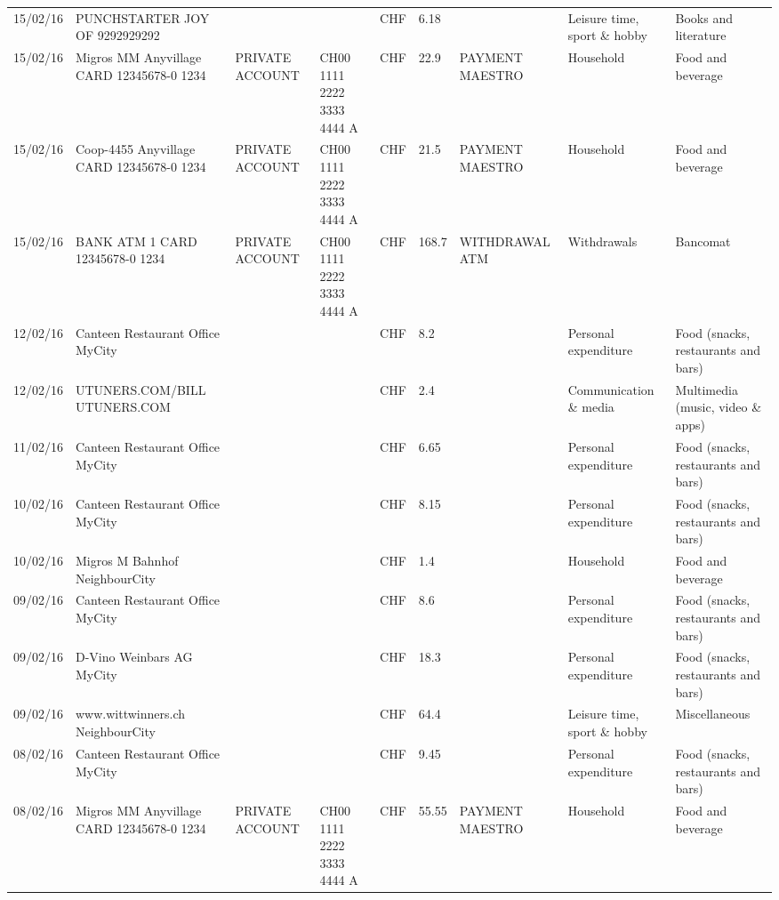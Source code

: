 \begin{landscape}
\begin{center}
\begin{longtable}{lllllllll}
		15/02/16 & PUNCHSTARTER JOY OF   9292929292 &       &       & CHF   & 6.18  &       & Leisure time, sport \& hobby & Books and literature \\
		15/02/16 & Migros MM Anyvillage CARD 12345678-0 1234 & PRIVATE ACCOUNT & CH00 1111 2222 3333 4444 A & CHF   & 22.9  & PAYMENT MAESTRO & Household & Food and beverage \\
		15/02/16 & Coop-4455 Anyvillage CARD 12345678-0 1234 & PRIVATE ACCOUNT & CH00 1111 2222 3333 4444 A & CHF   & 21.5  & PAYMENT MAESTRO & Household & Food and beverage \\
		15/02/16 & BANK ATM 1 CARD 12345678-0 1234 & PRIVATE ACCOUNT & CH00 1111 2222 3333 4444 A & CHF   & 168.7 & WITHDRAWAL ATM & Withdrawals & Bancomat \\
		12/02/16 & Canteen Restaurant Office      MyCity &       &       & CHF   & 8.2   &       & Personal expenditure & Food (snacks, restaurants and bars) \\
		12/02/16 & UTUNERS.COM/BILL          UTUNERS.COM &       &       & CHF   & 2.4   &       & Communication \& media & Multimedia (music, video \& apps) \\
		11/02/16 & Canteen Restaurant Office      MyCity &       &       & CHF   & 6.65  &       & Personal expenditure & Food (snacks, restaurants and bars) \\
		10/02/16 & Canteen Restaurant Office      MyCity &       &       & CHF   & 8.15  &       & Personal expenditure & Food (snacks, restaurants and bars) \\
		10/02/16 & Migros M Bahnhof         NeighbourCity &       &       & CHF   & 1.4   &       & Household & Food and beverage \\
		09/02/16 & Canteen Restaurant Office      MyCity &       &       & CHF   & 8.6   &       & Personal expenditure & Food (snacks, restaurants and bars) \\
		09/02/16 & D-Vino Weinbars AG       MyCity &       &       & CHF   & 18.3  &       & Personal expenditure & Food (snacks, restaurants and bars) \\
		09/02/16 & www.wittwinners.ch        NeighbourCity &       &       & CHF   & 64.4  &       & Leisure time, sport \& hobby & Miscellaneous \\
		08/02/16 & Canteen Restaurant Office      MyCity &       &       & CHF   & 9.45  &       & Personal expenditure & Food (snacks, restaurants and bars) \\
		08/02/16 & Migros MM Anyvillage CARD 12345678-0 1234 & PRIVATE ACCOUNT & CH00 1111 2222 3333 4444 A & CHF   & 55.55 & PAYMENT MAESTRO & Household & Food and beverage \\

\end{longtable}
\end{center}
\end{landscape}
